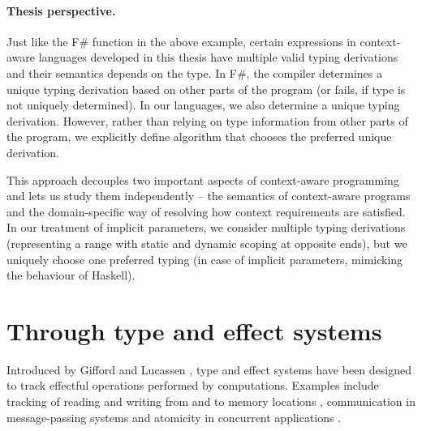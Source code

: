 \paragraph{Thesis perspective.}
Just like the F\# function in the above example, certain expressions in context-aware languages
developed in this thesis have multiple valid typing derivations and their semantics depends on the
type. In F\#, the compiler determines a unique typing derivation based on other parts of the program
(or fails, if type is not uniquely determined). In our languages, we also determine a unique typing
derivation. However, rather than relying on type information from other parts of the program, we
explicitly define algorithm that chooses the preferred unique derivation.

This approach decouples two important aspects of context-aware programming and lets us study them
independently -- the semantics of context-aware programs and the domain-specific way of resolving
how context requirements are satisfied. In our treatment of implicit parameters, we consider
multiple typing derivations (representing a range with static and dynamic scoping at opposite ends),
but we uniquely choose one preferred typing (in case of implicit parameters, mimicking the
behaviour of Haskell).



%
%

\section{Through type and effect systems}
\label{sec:path-eff}

Introduced by Gifford and Lucassen \cite{effects-gifford,effects-polymorphic}, type and effect
systems have been designed to track effectful operations performed by computations. Examples
include tracking of reading and writing from and to memory locations \cite{effects-talpin-et-al},
communication in message-passing systems \cite{effects-messagepassing} and atomicity in concurrent
applications \cite{effects-atomicity}.

